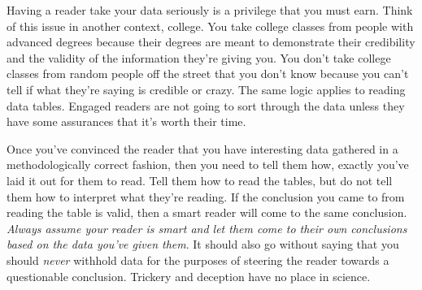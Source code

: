 \documentclass[]{tufte-handout}
\begin{document}
Having a reader take your data seriously is a privilege that you must earn. Think of this issue in another context, college. You take college classes from people with advanced degrees because their degrees are meant to demonstrate their credibility and the validity of the information they're giving you. You don't take college classes from random people off the street that you don't know because you can't tell if what they're saying is credible or crazy. The same logic applies to reading data tables. Engaged readers are not going to sort through the data unless they have some assurances that it's worth their time. 

Once you've convinced the reader that you have interesting data gathered in a methodologically correct fashion, then you need to tell them how, exactly you've laid it out for them to read. Tell them how to read the tables, but do not tell them how to interpret what they're reading. If the conclusion you came to from reading the table is valid, then a smart reader will come to the same conclusion.  \textit{Always assume your reader is smart and let them come to their own conclusions based on the data you've given them}. It should also go without saying that you should \textit{never} withhold data for the purposes of steering the reader towards a questionable conclusion. Trickery and deception have no place in science. 
\end{document}
